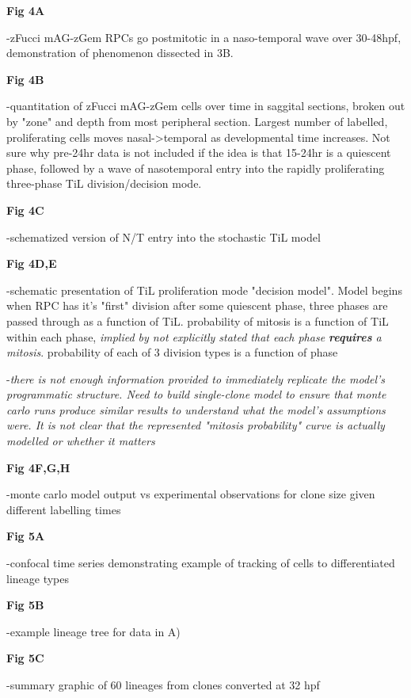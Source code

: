 \documentclass{ut-thesis}
\begin{document}
\bigskip

\textbf{Fig 4A}

-zFucci mAG-zGem RPCs go postmitotic in a naso-temporal wave over 30-48hpf, demonstration of phenomenon dissected in 3B.

\textbf{Fig 4B}

-quantitation of zFucci mAG-zGem cells over time in saggital sections, broken out by "zone" and depth from most peripheral section. Largest number of labelled, proliferating cells moves nasal->temporal as developmental time increases. Not sure why pre-24hr data is not included if the idea is that 15-24hr is a quiescent phase, followed by a wave of nasotemporal entry into the rapidly proliferating three-phase TiL division/decision mode.

\textbf{Fig 4C}

-schematized version of N/T entry into the stochastic TiL model

\textbf{Fig 4D,E}

-schematic presentation of TiL proliferation mode "decision model". Model begins when RPC has it's "first" division after some quiescent phase, three phases are passed through as a function of TiL. probability of mitosis is a function of TiL within each phase, \textit{implied by not explicitly stated that each phase \textbf{requires} a mitosis}. probability of each of 3 division types is a function of phase

-\textit{there is not enough information provided to immediately replicate the model's programmatic structure. Need to build single-clone model to ensure that monte carlo runs produce similar results to understand what the model's assumptions were. It is not clear that the represented "mitosis probability" curve is actually modelled or whether it matters}

\textbf{Fig 4F,G,H}

-monte carlo model output vs experimental observations for clone size given different labelling times

\bigskip

\textbf{Fig 5A}

-confocal time series demonstrating example of tracking of cells to differentiated lineage types

\textbf{Fig 5B}

-example lineage tree for data in A)

\textbf{Fig 5C}

-summary graphic of 60 lineages from clones converted at 32 hpf
\end{document}
